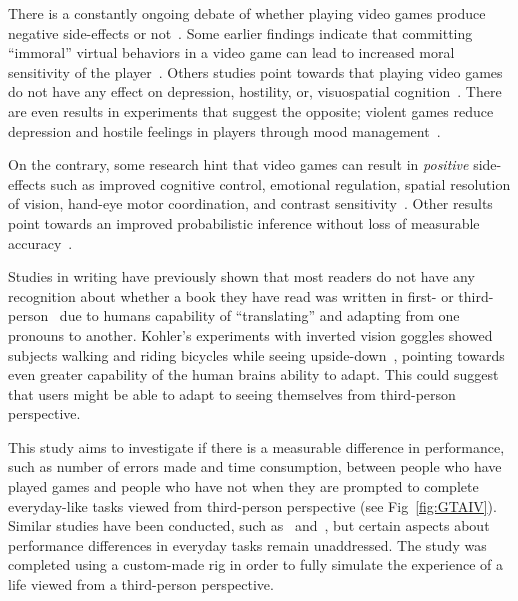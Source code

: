 \documentclass[runningheads,a4paper,oribibl]{llncs}
\begin{document}
There is a constantly ongoing debate of whether playing video games produce negative side-effects or not~\cite{tear2014video}. Some earlier findings indicate that committing ``immoral'' virtual behaviors in a video game can lead to increased moral sensitivity of the player~\cite{grizzard2014being}. Others studies point towards that playing video games do not have any effect on depression, hostility, or, visuospatial cognition~\cite{valadez2012just}. There are even results in experiments that suggest the opposite; violent games reduce depression and hostile feelings in players through mood management~\cite{ferguson2015hitman}. 

On the contrary, some research hint that video games can result in \emph{positive} side-effects such as improved cognitive control, emotional regulation, spatial resolution of vision, hand-eye motor coordination, and contrast sensitivity~\cite{gong2015enhanced}. Other results point towards an improved probabilistic inference without loss of measurable accuracy~\cite{green2010improved}.

Studies in writing have previously shown that most readers do not have any recognition about whether a book they have read was written in first- or third-person~\cite{hagg2012nya} due to humans capability of ``translating'' and adapting from one pronouns to another. Kohler's experiments with inverted vision goggles showed subjects walking and riding bicycles while seeing upside-down~\cite{kohler1962goggles}, pointing towards even greater capability of the human brains ability to adapt. This could suggest that users might be able to adapt to seeing themselves from third-person perspective.

This study aims to investigate if there is a measurable difference in performance, such as number of errors made and time consumption, between people who have played games and people who have not when they are prompted to complete everyday-like tasks viewed from third-person perspective (see Fig~\ref{fig:GTAIV}). Similar studies have been conducted, such as~\cite{schmierbach2011exploring} and~\cite{nakamura20103pi}, but certain aspects about performance differences in everyday tasks remain unaddressed. The study was completed using a custom-made rig in order to fully simulate the experience of a life viewed from a third-person perspective.
\end{document}
